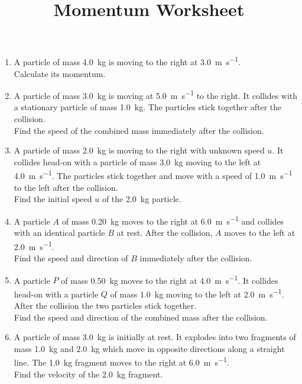 \documentclass[11pt,a4paper]{article}
\begin{document}
\title{Momentum Worksheet}
\author{}
\date{}
\maketitle

\begin{enumerate}
    \item A particle of mass \SI{4.0}{\kilogram} is moving to the right at \SI{3.0}{\meter\per\second}. \\
    Calculate its momentum.

    \item A particle of mass \SI{3.0}{\kilogram} is moving at \SI{5.0}{\meter\per\second} to the right. It collides with a stationary particle of mass \SI{1.0}{\kilogram}. The particles stick together after the collision. \\
    Find the speed of the combined mass immediately after the collision.

    \item A particle of mass \SI{2.0}{\kilogram} is moving to the right with unknown speed $u$. It collides head-on with a particle of mass \SI{3.0}{\kilogram} moving to the left at \SI{4.0}{\meter\per\second}. The particles stick together and move with a speed of \SI{1.0}{\meter\per\second} to the left after the collision. \\
    Find the initial speed $u$ of the \SI{2.0}{\kilogram} particle.

    \item A particle $A$ of mass \SI{0.20}{\kilogram} moves to the right at \SI{6.0}{\meter\per\second} and collides with an identical particle $B$ at rest. After the collision, $A$ moves to the left at \SI{2.0}{\meter\per\second}. \\
    Find the speed and direction of $B$ immediately after the collision.

    \item A particle $P$ of mass \SI{0.50}{\kilogram} moves to the right at \SI{4.0}{\meter\per\second}. It collides head-on with a particle $Q$ of mass \SI{1.0}{\kilogram} moving to the left at \SI{2.0}{\meter\per\second}. After the collision the two particles stick together. \\
    Find the speed and direction of the combined mass after the collision.

    \item A particle of mass \SI{3.0}{\kilogram} is initially at rest. It explodes into two fragments of mass \SI{1.0}{\kilogram} and \SI{2.0}{\kilogram} which move in opposite directions along a straight line. The \SI{1.0}{\kilogram} fragment moves to the right at \SI{6.0}{\meter\per\second}. \\
    Find the velocity of the \SI{2.0}{\kilogram} fragment.


\end{enumerate}
\end{document}
